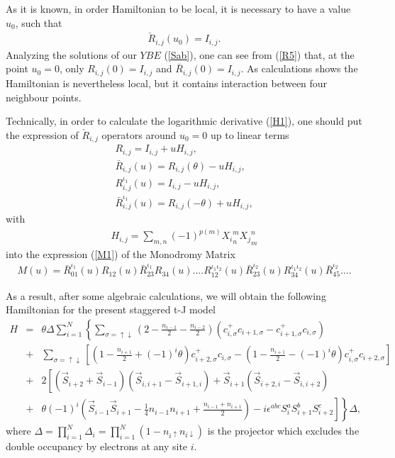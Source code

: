 \documentclass[a4paper,12pt]{article}
\newcommand{\nn}{\nonumber}
\begin{document}
As it is known, in order Hamiltonian to be local, it is necessary
to have a value $u_0$, such that 
\begin{eqnarray}
\label{RI}
\check{R}_{i,j}(u_0)=I_{i,j}.
\end{eqnarray}
Analyzing the solutions of our $YBE$ (\ref{Sab}),
one can see from (\ref{R5}) that, at the point  $u_0=0$, only
$R_{i,j}(0)=I_{i,j}$ and $\bar{R}_{i,j}(0)=I_{i,j}$. 
As calculations shows the Hamiltonian is nevertheless local,
but it contains interaction between four neighbour points.

Technically, in order to calculate the logarithmic derivative
(\ref{H1}), one should put the expression of $\check{R}_{i,j}$
operators around $u_0=0$ up to linear terms
\begin{eqnarray}
\label{4RH}
R_{i,j}=I_{i,j}+uH_{i,j}, \nonumber\\
\bar{R}_{i,j}(u)=R_{i,j}(\theta)-uH_{i,j},\nonumber\\
R_{i,j}^{\iota_1}(u)=I_{i,j}-uH_{i,j},\nonumber\\
\bar{R}_{i,j}^{\iota_1}(u)={R}_{i,j}(-\theta)+uH_{i,j},
\end{eqnarray}
with
\begin{eqnarray}
\label{Hij}
H_{i,j}=\sum_{m,n}(-1)^{p(m)}{X_i}^{m}_{n}{X_j}^{n}_{m}
\end{eqnarray}
into the expression (\ref{M1}) of the Monodromy Matrix
\begin{eqnarray}
\label{MR} 
M(u)=\bar{R}_{01}^{\iota_1}(u)R_{12}(u)\bar{R}_{23}^{\iota_1}R_{34}(u)....
R_{12}^{\iota_1\iota_2}(u)\bar{R}_{23}^{\iota_2}(u)R_{34}^{\iota_1\iota_2}(u)\bar{R}_{45}^{\iota_2}
....
\end{eqnarray}

As a result, after some algebraic calculations, we will obtain the
following Hamiltonian for the present staggered t-J model
\begin{eqnarray}
\label{H2}
H&=&\theta \Delta \sum_{i=1}^{N}\left\{\sum_{\sigma=\uparrow \downarrow}
\left(
2-\frac{n_{i-1}}{2}-\frac{n_{i-2}}{2}\right)(c_{i,\sigma}^{+}c_{i+1,\sigma}
-c_{i+1,\sigma}^{+}c_{i,\sigma})\right.\nn\\
&+&\left.\sum_{\sigma=\uparrow\downarrow}
\left[\left(1-\frac{n_{i+1}}{2}+(-1)^{i}\theta\right)
c_{i+2,\sigma}^{+}c_{i,\sigma}
-\left(1-\frac{n_{i+1}}{2}-(-1)^{i}\theta\right)c_{i,\sigma}^{+}
c_{i+2,\sigma}\right]\right.\nn\\
&+&\left.2 \left[(\vec{S}_{i+2}+\vec{S}_{i-1})(\vec{S}_{i,i+1}-
\vec{S}_{i+1,i})+\vec{S}_{i+1}(\vec{S}_{i+2,i}-\vec{S}_{i,i+2})\right.\right.
\\
&+&\left.\left.\theta(-1)^{i}\left(\vec{S}_{i-1}\vec{S}_{i+1}-
\frac{1}{4}n_{i-1}n_{i+1}+
\frac{n_{i-1}+n_{i+1}}{2}\right)-i{\epsilon}^{abc}S_{i}^{a}S_{i+1}^{b}
S_{i+2}^c\right]\right\} \Delta,\nn
\end{eqnarray}
where ${\Delta}=\prod_{i=1}^{N}\Delta_{i}=\prod_{i=1}^{N}(1-n_{i\uparrow}
n_{i\downarrow})$ is the projector which excludes the double occupancy by
electrons at any site $i$.
\end{document}
